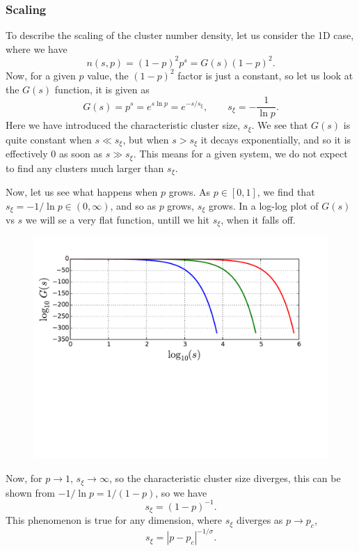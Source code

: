 \documentclass[a4paper, 11pt, notitlepage, english]{article}
\begin{document}
\subsubsection*{Scaling}
To describe the scaling of the cluster number density, let us consider the 1D case, where we have
$$n(s,p) = (1-p)^2 p^s = G(s)(1-p)^2.$$
Now, for a given $p$ value, the $(1-p)^2$ factor is just a constant, so let us look at the $G(s)$ function, it is given as
$$G(s) = p^s = e^{s \ln p} = e^{-s/s_\xi}, \qquad s_\xi = -\frac{1}{\ln p}.$$
Here we have introduced the characteristic cluster size, $s_\xi$. We see that $G(s)$ is quite constant when $s \ll s_\xi$, but when $s > s_\xi$ it decays exponentially, and so it is effectively 0 as soon as $s \gg s_\xi$. This means for a given system, we do not expect to find any clusters much larger than $s_\xi$.

Now, let us see what happens when $p$ grows. As $p\in[0,1]$, we find that $s_\xi = -1/\ln p \in (0, \infty)$, and so as $p$ grows, $s_\xi$ grows. In a log-log plot of $G(s)$ vs $s$ we will se a very flat function, untill we hit $s_\xi$, when it falls off.
\begin{figure}[ht]
\centering
\includegraphics[width=\textwidth]{12.pdf}
\end{figure}

\vspace{-4cm}

Now, for $p\to 1$, $s_\xi \to \infty$, so the characteristic cluster size diverges, this can be shown from $-1/\ln p = 1/(1-p)$, so we have
$$s_\xi = (1-p)^{-1}.$$
This phenomenon is true for any dimension, where $s_\xi$ diverges as $p\to p_c$,
$$s_\xi = |p-p_c|^{-1/\sigma}.$$
\end{document}
